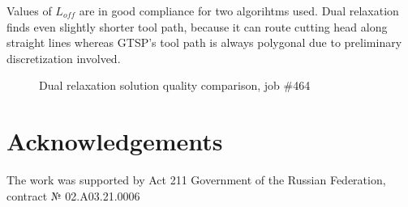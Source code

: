 \documentclass{../download/tPRS2e}
\begin{document}
Values of $L_{off}$ are in good compliance for two algorihtms used.
Dual relaxation finds even slightly shorter tool path,
because it can route cutting head along straight lines
whereas GTSP's tool path is always polygonal
due to preliminary discretization involved.

\begin{figure}
    \begin{center}
    \caption{Dual relaxation solution quality comparison, job \#464} \label{quality}
    \end{center}
\end{figure}


\section*{Acknowledgements}

The work was supported by Act 211 Government of the Russian Federation, contract № 02.A03.21.0006


\nocite{*}

\end{document}
